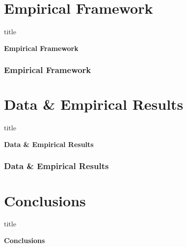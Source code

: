 \documentclass[11pt]{beamer}
\begin{document}
\section[Framework]{Empirical Framework}
	\begin{frame}

	
	\begin{beamercolorbox}{title}
		\begin{center}
			\bfseries \huge Empirical Framework
		\end{center}	
	\end{beamercolorbox}
	
\end{frame}

\begin{frame}

	\frametitle{\bfseries Empirical Framework}
\end{frame}
\section[Data \& Results]{Data \& Empirical Results}
	
	\begin{frame}

	
	\begin{beamercolorbox}{title}
		\begin{center}
			\bfseries \huge Data \& Empirical Results
		\end{center}	
	\end{beamercolorbox}
	
\end{frame}

\begin{frame}

	\frametitle{\bfseries Data \& Empirical Results}
\end{frame}
\section[Conclusions]{Conclusions}
\begin{frame}

	
	\begin{beamercolorbox}{title}
		\begin{center}
			\bfseries \huge Conclusions
		\end{center}	
	\end{beamercolorbox}
	
\end{frame}
\end{document}
